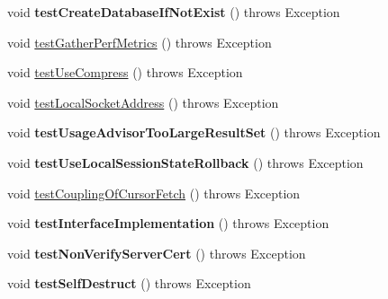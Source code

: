 \begin{DoxyCompactItemize}
\item 
\mbox{\label{classtestsuite_1_1simple_1_1_connection_test_a0293a623600d8ff3ca51a6830f46dea2}} 
void {\bfseries test\+Create\+Database\+If\+Not\+Exist} ()  throws Exception 
\item 
void \mbox{\hyperlink{classtestsuite_1_1simple_1_1_connection_test_a3efc92c350b402367a66355fe3305381}{test\+Gather\+Perf\+Metrics}} ()  throws Exception 
\item 
void \mbox{\hyperlink{classtestsuite_1_1simple_1_1_connection_test_ab5c3f7762742c5135e360e5ad11f59e5}{test\+Use\+Compress}} ()  throws Exception 
\item 
void \mbox{\hyperlink{classtestsuite_1_1simple_1_1_connection_test_af716a61440ab4bf588f5160f6ca5aafb}{test\+Local\+Socket\+Address}} ()  throws Exception 
\item 
\mbox{\label{classtestsuite_1_1simple_1_1_connection_test_a169f5501b8761483ee76515dbf74cb88}} 
void {\bfseries test\+Usage\+Advisor\+Too\+Large\+Result\+Set} ()  throws Exception 
\item 
\mbox{\label{classtestsuite_1_1simple_1_1_connection_test_afb4fb6217aa0ef099d610a92a8be2bfb}} 
void {\bfseries test\+Use\+Local\+Session\+State\+Rollback} ()  throws Exception 
\item 
void \mbox{\hyperlink{classtestsuite_1_1simple_1_1_connection_test_a64a129c95efd45055e9abf405d3eb5b1}{test\+Coupling\+Of\+Cursor\+Fetch}} ()  throws Exception 
\item 
\mbox{\label{classtestsuite_1_1simple_1_1_connection_test_ae0d18c12f2bca2f80cf011479822713e}} 
void {\bfseries test\+Interface\+Implementation} ()  throws Exception 
\item 
\mbox{\label{classtestsuite_1_1simple_1_1_connection_test_a728791cc1f2724f19b673701ea51362d}} 
void {\bfseries test\+Non\+Verify\+Server\+Cert} ()  throws Exception 
\item 
\mbox{\label{classtestsuite_1_1simple_1_1_connection_test_af87c212adeb44aa3ab686c638bcc922d}} 
void {\bfseries test\+Self\+Destruct} ()  throws Exception 

\end{DoxyCompactItemize}
